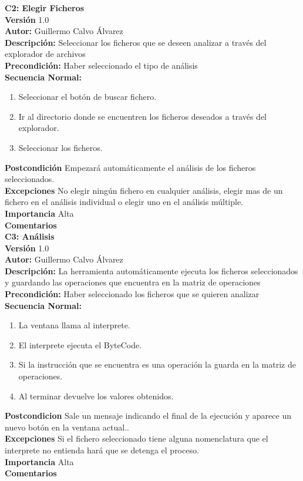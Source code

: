 \textbf{C2: Elegir Ficheros}\\
\textbf{Versión} 1.0\\
\textbf{Autor:}  Guillermo Calvo Álvarez\\
\textbf{Descripción:} Seleccionar los ficheros que se deseen analizar a través del explorador de archivos\\
\textbf{Precondición:} Haber seleccionado el tipo de análisis\\
\textbf{Secuencia Normal:}\\
\begin{enumerate}
	\item Seleccionar el botón de buscar fichero.
	\item Ir al directorio donde se encuentren los ficheros deseados a través del explorador. 
	\item Seleccionar los ficheros. 
\end{enumerate}
\textbf{Postcondición} Empezará automáticamente el análisis de los ficheros seleccionados.\\
\textbf{Excepciones} No elegir ningún fichero en cualquier análisis, elegir mas de un fichero en el análisis individual o elegir uno en el análisis múltiple.\\
\textbf{Importancia} Alta\\
\textbf{Comentarios}\\

\textbf{C3: Análisis}\\
\textbf{Versión} 1.0\\
\textbf{Autor:}  Guillermo Calvo Álvarez\\
\textbf{Descripción:} La herramienta automáticamente ejecuta los ficheros seleccionados y guardando las operaciones que encuentra en la matriz de operaciones\\
\textbf{Precondición:} Haber seleccionado los ficheros que se quieren analizar\\
\textbf{Secuencia Normal:}\\
\begin{enumerate}
	\item La ventana llama al interprete.
	\item El interprete ejecuta el ByteCode. 
	\item Si la instrucción que se encuentra es una operación la guarda en la  matriz de operaciones. 
	\item Al terminar devuelve los valores obtenidos. 
\end{enumerate}
\textbf{Postcondicion} Sale un mensaje indicando el final de la ejecución y aparece un nuevo botón en la ventana actual..\\
\textbf{Excepciones} Si el fichero seleccionado tiene alguna nomenclatura que el interprete no entienda hará que se detenga el proceso.\\
\textbf{Importancia} Alta\\
\textbf{Comentarios}\\

